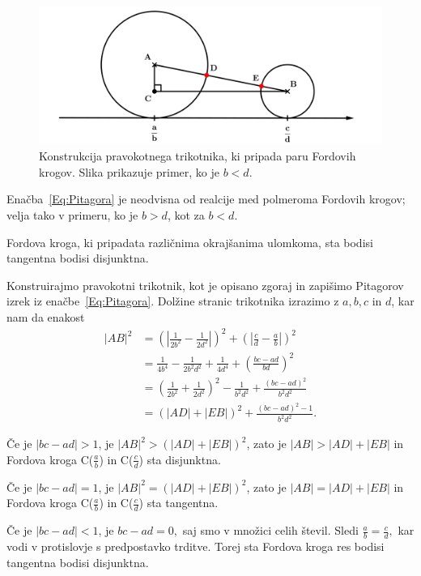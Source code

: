 \documentclass[mat1]{fmfdelo}
\begin{document}
\begin{figure}[h!]
\begin{center}
\includegraphics[scale=0.55]{pitagora1.png}
\caption{Konstrukcija pravokotnega trikotnika, ki pripada paru Fordovih krogov. Slika prikazuje primer, ko je $b<d$.}
\label{Fig:Pitagora}
\end{center}
\end{figure}

\begin{opomba}
Enačba~\ref{Eq:Pitagora} je neodvisna od realcije med polmeroma Fordovih krogov; velja tako v primeru, ko je $b>d$, kot za $b<d$.
\end{opomba}
%

\begin{trditev}
\label{trd:FordDisjTang}
Fordova kroga, ki pripadata različnima okrajšanima ulomkoma, sta bodisi tangentna bodisi disjunktna.
\end{trditev}

\begin{dokaz}
Konstruirajmo pravokotni trikotnik, kot je opisano zgoraj in zapišimo Pitagorov izrek iz enačbe~\eqref{Eq:Pitagora}.
Dolžine stranic trikotnika izrazimo z $a, b, c$ in $d$, kar nam da enakost
%
\begin{align}
|AB|^2 
  &= \left ( \left| \frac{1}{2b^2} - \frac{1}{2d^2} \right| \right)^2  + \left ( \left| \frac{c}{d} - \frac{a}{b} \right| \right )^2 \nonumber \\ 
  &= \frac{1}{4b^4} - \frac{1}{2b^2d^2} + \frac{1}{4d^4} + \left (\frac{bc-ad}{bd} \right )^2 \nonumber \\
  &= \left (\frac{1}{2b^2} + \frac{1}{2d^2} \right )^2 - \frac{1}{b^2d^2} + \frac{(bc-ad)^2}{b^2d^2} \nonumber \\
  &= (|AD| + |EB|)^2 + \frac{(bc-ad)^2-1}{b^2d^2}.
\end{align}

Če je $|bc-ad|>1$, je $|AB|^2 > (|AD| + |EB|)^2$, zato je $|AB| > |AD| + |EB|$ in Fordova kroga C($\frac{a}{b}$) in C($\frac{c}{d}$) sta disjunktna.

Če je $|bc-ad|=1$, je $|AB|^2 = (|AD| + |EB|)^2$, zato je $|AB| = |AD| + |EB|$ in Fordova kroga C($\frac{a}{b}$) in C($\frac{c}{d}$) sta tangentna.

Če je $|bc-ad|<1$, je $bc-ad = 0,$ saj smo v množici celih števil. Sledi $\frac{a}{b} = \frac{c}{d},$ kar vodi v protislovje s predpostavko trditve.
Torej sta Fordova kroga res bodisi tangentna bodisi disjunktna.
\end{dokaz}
\end{document}
